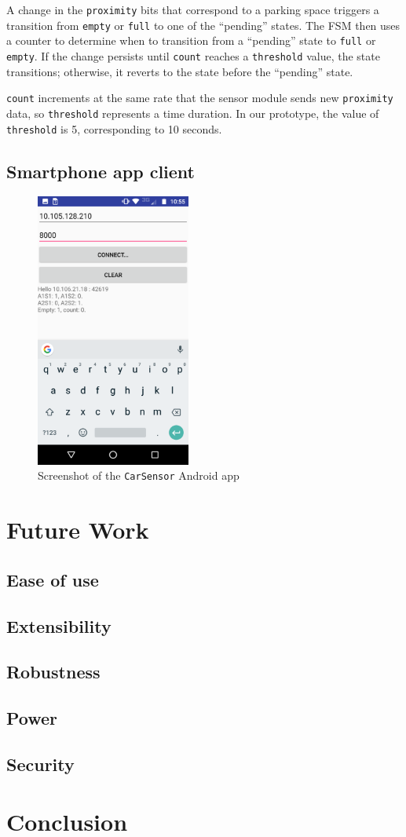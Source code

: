 \documentclass[conference]{IEEEtran}
\begin{document}
A change in the \texttt{proximity} bits that correspond to a parking space triggers a transition from \texttt{empty} or \texttt{full} to one of the ``pending'' states. The FSM then uses a counter to determine when to transition from a ``pending'' state to \texttt{full} or \texttt{empty}. If the change persists until \texttt{count} reaches a \texttt{threshold} value, the state transitions; otherwise, it reverts to the state before the ``pending'' state.

\texttt{count} increments at the same rate that the sensor module sends new \texttt{proximity} data, so \texttt{threshold} represents a time duration. In our prototype, the value of \texttt{threshold} is 5, corresponding to 10 seconds.
\subsection{Smartphone app client}
\begin{figure}[h]
	\centering
	\includegraphics[width=2.0in]{app.png}
	\caption{Screenshot of the \texttt{CarSensor} Android app}
	\label{fig_app}
\end{figure}
\section{Future Work}\label{sec_futurework}
\subsection{Ease of use}
\subsection{Extensibility}
\subsection{Robustness}
\subsection{Power}
\subsection{Security}
\section{Conclusion}
\end{document}
